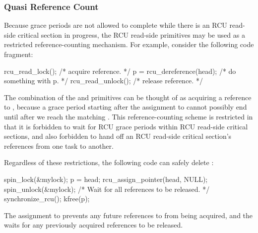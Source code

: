 \subsubsection{Quasi Reference Count}
\label{sec:defer:Quasi Reference Count}

Because grace periods are not allowed to complete while
there is an RCU read-side critical section in progress,
the RCU read-side primitives may be used as a restricted
reference-counting mechanism.
For example, consider the following code fragment:

\begin{VerbatimN}
rcu_read_lock();  /* acquire reference. */
p = rcu_dereference(head);
/* do something with p. */
rcu_read_unlock();  /* release reference. */
\end{VerbatimN}

The combination of the  and 
primitives can be thought of as acquiring a reference to ,
because a grace period starting after the 
assignment to  cannot possibly end until after we reach the matching
.
This reference-counting scheme is restricted in that it is forbidden
to wait for RCU grace periods within RCU read-side critical sections,
and also forbidden to hand off an RCU read-side critical section's
references from one task to another.

Regardless of these restrictions,
the following code can safely delete :

\begin{VerbatimN}
spin_lock(&mylock);
p = head;
rcu_assign_pointer(head, NULL);
spin_unlock(&mylock);
/* Wait for all references to be released. */
synchronize_rcu();
kfree(p);
\end{VerbatimN}

The assignment to  prevents any future references
to  from being acquired, and the 
waits for any previously acquired references to be released.

\QuickQuizEnd

